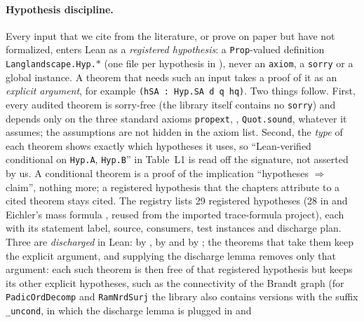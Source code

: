 
\begin{sloppypar}
\paragraph{Hypothesis discipline.}
Every input that we cite from the literature, or prove on paper but have not formalized, enters Lean as a
\emph{registered hypothesis}: a \texttt{Prop}-valued definition \texttt{Langlandscape.Hyp.$\ast$} (one file per
hypothesis in ), never an \texttt{axiom}, a \texttt{sorry} or a global instance. A theorem
that needs such an input takes a proof of it as an \emph{explicit argument}, for example
\texttt{(hSA : Hyp.SA d q hq)}. Two things follow. First, every audited theorem is sorry-free (the library itself contains no \texttt{sorry}) and depends only
on the three standard axioms \texttt{propext}, , \texttt{Quot.sound}, whatever it assumes;
the assumptions are not hidden in the axiom list. Second, the \emph{type} of each theorem shows exactly which hypotheses
it uses, so ``Lean-verified conditional on \texttt{Hyp.A}, \texttt{Hyp.B}'' in Table~L1 is read off the signature, not
asserted by us. A conditional theorem is a proof of the implication ``hypotheses $\Rightarrow$ claim'', nothing more;
a registered hypothesis that the chapters attribute to a cited theorem stays cited. The registry
 lists 29 registered hypotheses (28 in  and
Eichler's mass formula , reused from the imported trace-formula project), each with its
statement label, source, consumers, test instances and discharge plan. Three are \emph{discharged} in Lean:
 by ,  by
 and  by \BSFdischargeName; the theorems that take them keep the explicit argument, and supplying the discharge lemma removes only that argument: each such theorem is then free of that registered hypothesis but keeps its other explicit hypotheses, such as the connectivity  of the Brandt graph (for \texttt{PadicOrdDecomp} and \texttt{RamNrdSurj} the library also contains versions with the suffix \texttt{\_uncond}, in which the discharge lemma is plugged in and

\end{sloppypar}
